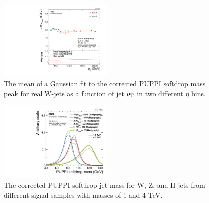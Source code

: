 \begin{figure}[h!]
\centering
\includegraphics[width=0.49\textwidth]{figures/analysis/search2/AN-16-235/plots/ClosureTest_RecoMass.pdf}
\caption{The mean of a Gaussian fit to the corrected PUPPI softdrop mass peak for real W-jets as a function of jet $p_{\mathrm{T}}$ in two different $\eta$ bins.}
\label{fig:searchII:wtagclosure}
\end{figure}
\begin{figure}[h!]
\centering
\includegraphics[width=0.49\textwidth]{figures/analysis/search2/AN-16-235/plots/SoftdropMass_NEWCORR_wH0.pdf}
\caption{The corrected PUPPI softdrop jet mass for W, Z, and H jets from different signal samples with masses of 1 and 4 TeV.}
\label{fig:search2:corrMass}
\end{figure}

